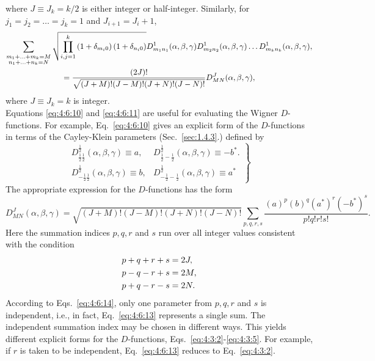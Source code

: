 where $J \equiv J_{k}=k / 2$ is either integer or half-integer. Similarly, for $j_{1}=j_{2}=\ldots=j_{k}=1$ and $J_{i+1}=J_{i}+1$,
\begin{gather}
\sum_{\substack{m_{1}+\ldots+m_{k}=M \\
n_{1}+\ldots+n_{k}=N}} \sqrt{\prod_{i, j=1}^{k}\left(1+\delta_{m_{i} 0}\right)\left(1+\delta_{n_{i} 0}\right)} D_{m_{1} n_{1}}^{1}(\alpha, \beta, \gamma) D_{m_{2} n_{2}}^{1}(\alpha, \beta, \gamma) \ldots D_{m_{k} n_{k}}^{1}(\alpha, \beta, \gamma)  ,\notag\\
=\frac{(2 J)!}{\sqrt{(J+M)!(J-M)!(J+N)!(J-N)!}} D_{M N}^{J}(\alpha, \beta, \gamma) ,\label{eq:4:6:11}
\end{gather}
where $J \equiv J_{k}=k$ is integer.\\
Equations \eqref{eq:4:6:10} and \eqref{eq:4:6:11} are useful for evaluating the Wigner $D$-functions. For example, Eq.~\eqref{eq:4:6:10} gives an explicit form of the $D$-functions in terms of the Cayley-Klein parameters (Sec.~\ref{sec:1.4.3}.) defined by
\begin{equation}
\left.\begin{array}{lc}
D_{\frac{1}{2} \frac{1}{2}}^{\frac{1}{2}}(\alpha, \beta, \gamma) \equiv a, & D_{\frac{1}{2}-\frac{1}{2}}^{\frac{1}{2}}(\alpha, \beta, \gamma) \equiv-b^{*}  .\label{eq:4:6:12}\\
D_{-\frac{1}{2} \frac{1}{2}}^{\frac{1}{2}}(\alpha, \beta, \gamma) \equiv b, & D_{-\frac{1}{2}-\frac{1}{2}}^{\frac{1}{2}}(\alpha, \beta, \gamma) \equiv a^{*}
\end{array}\right\}
\end{equation}
The appropriate expression for the $D$-functions has the form
\begin{equation}
D_{M N}^{J}(\alpha, \beta, \gamma)=\sqrt{(J+M)!(J-M)!(J+N)!(J-N)!} \sum_{p, q, r, s} \frac{(a)^{p}(b)^{q}\left(a^{*}\right)^{r}\left(-b^{*}\right)^{s}}{p!q!r!s!} .\label{eq:4:6:13}
\end{equation}
Here the summation indices $p, q, r$ and $s$ run over all integer values consistent with the condition
\begin{align}
& p+q+r+s=2 J  ,\notag\\
& p-q-r+s=2 M  ,\label{eq:4:6:14}\\
& p+q-r-s=2 N .\notag
\end{align}
According to Eqs.~\eqref{eq:4:6:14}, only one parameter from $p, q, r$ and $s$ is independent, i.e., in fact, Eq.~\eqref{eq:4:6:13} represents a single sum. The independent summation index may be chosen in different ways. This yields different explicit forms for the $D$-functions, Eqs.~\eqref{eq:4:3:2}-\eqref{eq:4:3:5}. For example, if $r$ is taken to be independent, Eq.~\eqref{eq:4:6:13} reduces to Eq.~\eqref{eq:4:3:2}.

